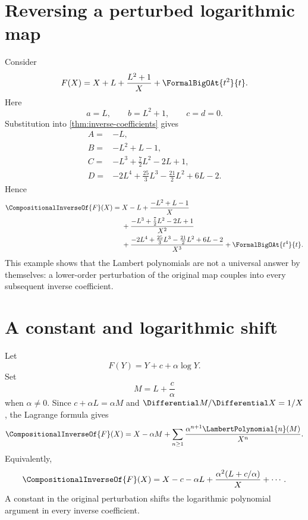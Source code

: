 \documentclass[11pt,openany]{book}
\theoremstyle{definition}
\theoremstyle{plain}
\theoremstyle{remark}
\newcommand{\rev}[1]{\CompositionalInverseOf{#1}}
\begin{document}
\section{Reversing a perturbed logarithmic map}
Consider
\begin{equation}\label{eq:worked-F-perturbed}
 F(X)=X+L+\frac{L^2+1}{X}+\FormalBigOAt{t^2}{t}.
\end{equation}
Here
\[
 a=L,
 \qquad b=L^2+1,
 \qquad c=d=0.
\]
Substitution into \cref{thm:inverse-coefficients} gives
\begin{align*}
 A={}&-L,\\
 B={}&-L^2+L-1,\\
 C={}&-L^3+\frac72L^2-2L+1,\\
 D={}&-2L^4+\frac{25}{3}L^3-\frac{21}{2}L^2+6L-2.
\end{align*}
Hence
\begin{equation}\label{eq:worked-inverse-perturbed}
\begin{split}
 \rev F(X)={}&X-L+\frac{-L^2+L-1}{X}\\
 &+\frac{-L^3+\tfrac72L^2-2L+1}{X^2}\\
 &+\frac{-2L^4+\tfrac{25}{3}L^3-\tfrac{21}{2}L^2+6L-2}{X^3}
 +\FormalBigOAt{t^4}{t}.
\end{split}
\end{equation}
This example shows that the Lambert polynomials are not a universal answer by
themselves: a lower-order perturbation of the original map couples into every
subsequent inverse coefficient.

\section{A constant and logarithmic shift}
Let
\begin{equation}\label{eq:constant-log-shift}
 F(Y)=Y+c+\alpha\log Y.
\end{equation}
Set
\[
 M=L+\frac c\alpha
\]
when \(\alpha\ne0\).  Since \(c+\alpha L=\alpha M\) and
\(\Differential M/\Differential X=1/X\), the Lagrange formula gives
\begin{equation}\label{eq:constant-log-shift-inverse}
 \rev F(X)
 =X-\alpha M+
 \sum_{n\ge1}\frac{\alpha^{n+1}\LambertPolynomial{n}(M)}{X^n}.
\end{equation}
Equivalently,
\[
 \rev F(X)=X-c-\alpha L
 +\frac{\alpha^2(L+c/\alpha)}X+\cdots.
\]
A constant in the original perturbation shifts the logarithmic polynomial
argument in every inverse coefficient.
\end{document}
